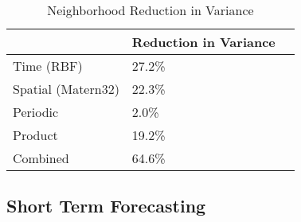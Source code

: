 \begin{table}[]
\centering
\caption{Neighborhood Reduction in Variance}
\label{variance_neighb}
\begin{tabular}{@{}lll@{}}
\toprule
                   & Reduction in Variance &  \\ \midrule
Time (RBF)         & 27.2\%                &  \\
Spatial (Matern32) & 22.3\%                &  \\
Periodic           & 2.0\%                 &  \\
Product            & 19.2\%                &  \\
Combined           & 64.6\%                &  \\ \bottomrule
\end{tabular}
\end{table}





\subsection{Short Term Forecasting}
